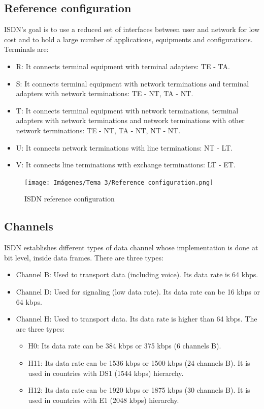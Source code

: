 \documentclass[
	12pt,
	twoside
]{book}
\begin{document}
\subsection{Reference configuration}

ISDN's goal is to use a reduced set of interfaces between user and network for low cost and to hold a large number of applications, equipments and configurations. Terminals are:

\begin{itemize}
	\item R: It connects terminal equipment with terminal adapters: TE - TA.
	\item S: It connects terminal equipment with network terminations and terminal adapters with network terminations: TE - NT, TA - NT.
	\item T: It connects terminal equipment with network terminations, terminal adapters with network terminations and network terminations with other network terminations: TE - NT, TA - NT, NT - NT.
	\item U: It connects network terminations with line terminations: NT - LT.
	\item V: It connects line terminations with exchange terminations: LT - ET.
\end{itemize}

\begin{figure}[H]
	\centering
	\texttt{[image: Imágenes/Tema 3/Reference configuration.png]}
	\caption{
		\label{fig:unit3_ref_conf}
		ISDN reference configuration
	}
\end{figure}

\subsection{Channels}

ISDN establishes different types of data channel whose implementation is done at bit level, inside data frames. There are three types:

\begin{itemize}
	\item Channel B: Used to transport data (including voice). Its data rate is 64 kbps.
	\item Channel D: Used for signaling (low data rate). Its data rate can be 16 kbps or 64 kbps.
	\item {
		Channel H: Used to transport data. Its data rate is higher than 64 kbps. The are three types:
		\begin{itemize}
			\item H0: Its data rate can be 384 kbps or 375 kbps (6 channels B).
			\item H11: Its data rate can be 1536 kbps or 1500 kbps (24 channels B). It is used in countries with DS1 (1544 kbps) hierarchy.
			\item H12: Its data rate can be 1920 kbps or 1875 kbps (30 channels B). It is used in countries with E1 (2048 kbps) hierarchy.
		\end{itemize}
	}
\end{itemize}
\end{document}
